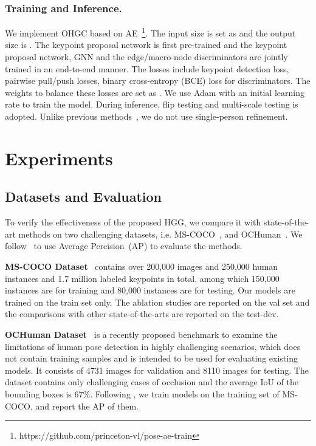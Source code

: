 \documentclass[runningheads]{llncs}
\begin{document}
	
	\subsubsection{Training and Inference.} 
	We implement OHGC based on AE~\cite{newell2017associative}\footnote{https://github.com/princeton-vl/pose-ae-train}. The input size is set as  and the output size is . The keypoint proposal network is first pre-trained and the keypoint proposal network, GNN and the edge/macro-node discriminators are jointly trained in an end-to-end manner. The losses include keypoint detection loss, pairwise pull/push losses, binary cross-entropy (BCE) loss for discriminators. The weights to balance these losses are set as . We use Adam with an initial learning rate  to train the model. During inference, flip testing and multi-scale testing is adopted. Unlike previous methods~\cite{cao2017realtime,newell2017associative}, we do not use single-person refinement. 
	
	
	\section{Experiments}
	\label{sec:exp}
	
	\subsection{Datasets and Evaluation}
	To verify the effectiveness of the proposed HGG, we compare it with state-of-the-art methods on two challenging datasets, i.e. MS-COCO~\cite{lin2014microsoft}, and OCHuman~\cite{zhang2019pose2seg}. We follow~\cite{andriluka2017posetrack} to use Average Percision~(AP) to evaluate the methods.
	
	\textbf{MS-COCO Dataset}~\cite{lin2014microsoft} contains over 200,000 images and 250,000 human instances and 1.7 million labeled keypoints in total, among which 150,000 instances are for training and 80,000 instances are for testing. Our models are trained on the train set only. The ablation studies are reported on the val set and the comparisons with other state-of-the-arts are reported on the test-dev. 
	
	
	\textbf{OCHuman Dataset}~\cite{zhang2019pose2seg} is a recently proposed benchmark to examine the limitations of human pose detection in highly challenging scenarios, which does not contain training samples and is intended to be used for evaluating existing models. It consists of 4731 images for validation and 8110 images for testing. The dataset contains only challenging cases of occlusion and the average IoU of the bounding boxes is 67\%. Following \cite{zhang2019pose2seg}, we train models on the training set of MS-COCO, and report the AP of them.
	
\end{document}
